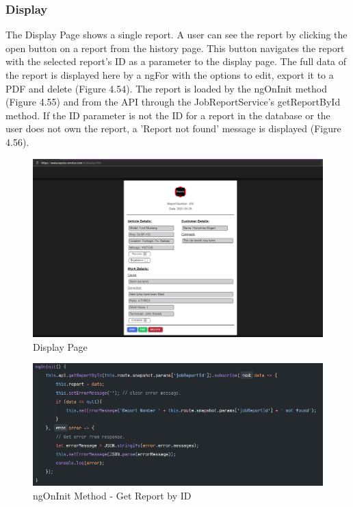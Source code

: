 \subsubsection{Display}
The Display Page shows a single report. A user can see the report by clicking the open button on a report from the history page. This button navigates the report with the selected report's ID as a parameter to the display page. The full data of the report is displayed here by a ngFor with the options to edit, export it to a PDF and delete (Figure 4.54). The report is loaded by the ngOnInit method (Figure 4.55) and from the API through the JobReportService's getReportById method. If the ID parameter is not the ID for a report in the database or the user does not own the report, a 'Report not found' message is displayed (Figure 4.56).  

\begin{figure}[H]
    \caption{Display Page}
    \label{image:displayPage}
    \centering
    \includegraphics[width=1.0\textwidth]{images/repota/UI/display-page.png}
\end{figure}

\begin{figure}[H]
    \caption{ngOnInit Method - Get Report by ID}
    \label{image:ng_reportbyID}
    \centering
    \includegraphics[width=1.0\textwidth]{images/repota/report_pages/display.png}
\end{figure}


